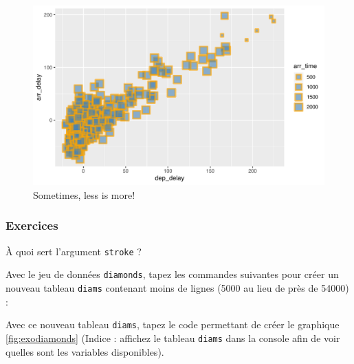 \documentclass[a4paperpaper,]{article}
\newenvironment{Shaded}{\begin{snugshade}}{\end{snugshade}}
\newcommand{\KeywordTok}[1]{\textcolor[rgb]{0.13,0.29,0.53}{\textbf{#1}}}
\newcommand{\DecValTok}[1]{\textcolor[rgb]{0.00,0.00,0.81}{#1}}
\newcommand{\StringTok}[1]{\textcolor[rgb]{0.31,0.60,0.02}{#1}}
\newcommand{\CommentTok}[1]{\textcolor[rgb]{0.56,0.35,0.01}{\textit{#1}}}
\newcommand{\OperatorTok}[1]{\textcolor[rgb]{0.81,0.36,0.00}{\textbf{#1}}}
\newcommand{\NormalTok}[1]{#1}
\theoremstyle{definition}
\theoremstyle{definition}
\theoremstyle{definition}
\theoremstyle{remark}
\begin{document}
\begin{figure}[htpb]

{\centering \includegraphics[width=0.9\linewidth]{figure/badplot-1} 

}

\caption{Sometimes, less is more!}\label{fig:badplot}
\end{figure}

\subsubsection{Exercices}\label{exercices-3}

À quoi sert l'argument \texttt{stroke} ?

Avec le jeu de données \texttt{diamonds}, tapez les commandes suivantes
pour créer un nouveau tableau \texttt{diams} contenant moins de lignes
(5000 au lieu de près de 54000) :

\begin{Shaded}
\end{Shaded}

Avec ce nouveau tableau \texttt{diams}, tapez le code permettant de
créer le graphique \ref{fig:exodiamonds} (Indice : affichez le tableau
\texttt{diams} dans la console afin de voir quelles sont les variables
disponibles).
\end{document}
